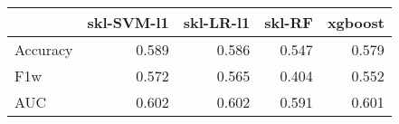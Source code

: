 \begin{tabular}{lrrrr}
\toprule
{} &  skl-SVM-l1 &  skl-LR-l1 &  skl-RF &  xgboost \\
\midrule
Accuracy &       0.589 &      0.586 &   0.547 &    0.579 \\
F1w      &       0.572 &      0.565 &   0.404 &    0.552 \\
AUC      &       0.602 &      0.602 &   0.591 &    0.601 \\
\bottomrule
\end{tabular}
